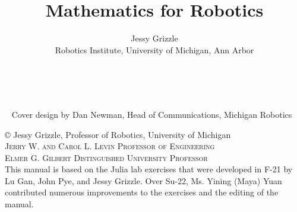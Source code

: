\documentclass[letterpaper]{book}
\title{Mathematics for Robotics}
\date{}
\author{Jessy Grizzle\\ Robotics Institute, University of Michigan, Ann Arbor}
\begin{document}
\newtheorem{thm}{Theorem}
\newtheorem{example}[thm]{Example}
\newtheorem{nonexample}[thm]{Non-Example}
\newtheorem{prop}[thm]{Proposition}
\newtheorem{lem}[thm]{Lemma}
\newtheorem{cor}[thm]{Corollary}
\newtheorem{claim}[thm]{Claim}
\newtheorem{rem}[thm]{Remark}
\newtheorem{definition}[thm]{Definition}
\newtheorem{notation}[thm]{Notation}
\newtheorem{fact}[thm]{Fact}
\newtheorem{notvocab}[thm]{Notation and Vocabulary}
\newtheorem{question}[thm]{Question}
\newtheorem{recall}[thm]{Recall}
\newtheorem{exercise}[thm]{Exercise}
\newtheorem{summary}[thm]{Summary}
\newtheorem{keyfact}[keyfacts]{Key Fact}

\begingroup
\thispagestyle{empty}

\mbox{  }


\endgroup

\clearpage


\begingroup
\thispagestyle{empty}


~\vfill
\thispagestyle{empty}
\noindent Cover design by Dan Newman, Head of Communications, Michigan Robotics

\vspace*{2cm}
\noindent\copyright{}	Jessy Grizzle,  Professor of Robotics, University of Michigan	\\
\noindent \textsc{Jerry W. and Carol L. Levin Professor of Engineering\\
Elmer G. Gilbert Distinguished University Professor}\\


\noindent This manual is based on the Julia lab exercises that were developed in F-21 by Lu Gan, John Pye, and Jessy Grizzle. Over Su-22, Ms. Yining (Maya) Yuan contributed numerous improvements to the exercises and the editing of the manual.
\\ %
\end{document}
